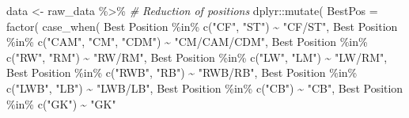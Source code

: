 \documentclass[
]{article}
\newenvironment{Shaded}{\begin{snugshade}}{\end{snugshade}}
\newcommand{\AttributeTok}[1]{\textcolor[rgb]{0.77,0.63,0.00}{#1}}
\newcommand{\CommentTok}[1]{\textcolor[rgb]{0.56,0.35,0.01}{\textit{#1}}}
\newcommand{\FunctionTok}[1]{\textcolor[rgb]{0.00,0.00,0.00}{#1}}
\newcommand{\NormalTok}[1]{#1}
\newcommand{\OtherTok}[1]{\textcolor[rgb]{0.56,0.35,0.01}{#1}}
\newcommand{\SpecialCharTok}[1]{\textcolor[rgb]{0.00,0.00,0.00}{#1}}
\newcommand{\StringTok}[1]{\textcolor[rgb]{0.31,0.60,0.02}{#1}}
\begin{document}
\begin{Shaded}
\begin{Highlighting}[]
\NormalTok{data }\OtherTok{\textless{}{-}}\NormalTok{ raw\_data }\SpecialCharTok{\%\textgreater{}\%}
    \CommentTok{\# Reduction of positions}
\NormalTok{    dplyr}\SpecialCharTok{::}\FunctionTok{mutate}\NormalTok{(}
        \AttributeTok{BestPos =} \FunctionTok{factor}\NormalTok{(}
            \FunctionTok{case\_when}\NormalTok{(}
                \StringTok{\textasciigrave{}}\AttributeTok{Best Position}\StringTok{\textasciigrave{}} \SpecialCharTok{\%in\%} \FunctionTok{c}\NormalTok{(}\StringTok{"CF"}\NormalTok{, }\StringTok{"ST"}\NormalTok{) }\SpecialCharTok{\textasciitilde{}} \StringTok{"CF/ST"}\NormalTok{,}
                \StringTok{\textasciigrave{}}\AttributeTok{Best Position}\StringTok{\textasciigrave{}}  \SpecialCharTok{\%in\%} \FunctionTok{c}\NormalTok{(}\StringTok{"CAM"}\NormalTok{, }\StringTok{"CM"}\NormalTok{, }\StringTok{"CDM"}\NormalTok{) }\SpecialCharTok{\textasciitilde{}} \StringTok{"CM/CAM/CDM"}\NormalTok{,}
                \StringTok{\textasciigrave{}}\AttributeTok{Best Position}\StringTok{\textasciigrave{}} \SpecialCharTok{\%in\%} \FunctionTok{c}\NormalTok{(}\StringTok{"RW"}\NormalTok{, }\StringTok{"RM"}\NormalTok{) }\SpecialCharTok{\textasciitilde{}} \StringTok{"RW/RM"}\NormalTok{,}
                \StringTok{\textasciigrave{}}\AttributeTok{Best Position}\StringTok{\textasciigrave{}} \SpecialCharTok{\%in\%} \FunctionTok{c}\NormalTok{(}\StringTok{"LW"}\NormalTok{, }\StringTok{"LM"}\NormalTok{) }\SpecialCharTok{\textasciitilde{}} \StringTok{"LW/RM"}\NormalTok{,}
                \StringTok{\textasciigrave{}}\AttributeTok{Best Position}\StringTok{\textasciigrave{}} \SpecialCharTok{\%in\%} \FunctionTok{c}\NormalTok{(}\StringTok{"RWB"}\NormalTok{, }\StringTok{"RB"}\NormalTok{) }\SpecialCharTok{\textasciitilde{}} \StringTok{"RWB/RB"}\NormalTok{,}
                \StringTok{\textasciigrave{}}\AttributeTok{Best Position}\StringTok{\textasciigrave{}} \SpecialCharTok{\%in\%} \FunctionTok{c}\NormalTok{(}\StringTok{"LWB"}\NormalTok{, }\StringTok{"LB"}\NormalTok{) }\SpecialCharTok{\textasciitilde{}} \StringTok{"LWB/LB"}\NormalTok{,}
                \StringTok{\textasciigrave{}}\AttributeTok{Best Position}\StringTok{\textasciigrave{}} \SpecialCharTok{\%in\%} \FunctionTok{c}\NormalTok{(}\StringTok{"CB"}\NormalTok{) }\SpecialCharTok{\textasciitilde{}} \StringTok{"CB"}\NormalTok{,}
                \StringTok{\textasciigrave{}}\AttributeTok{Best Position}\StringTok{\textasciigrave{}} \SpecialCharTok{\%in\%} \FunctionTok{c}\NormalTok{(}\StringTok{"GK"}\NormalTok{) }\SpecialCharTok{\textasciitilde{}} \StringTok{"GK"}

\end{Highlighting}
\end{Shaded}
\end{document}
